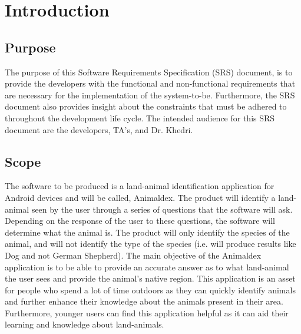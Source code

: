 \documentclass[]{article}
\begin{document}
\tableofcontents
\cleardoublepage
{}

\section{Introduction}
\label{sec:introduction}



\subsection{Purpose}
\label{sub:purpose}

The purpose of this Software Requirements Specification (SRS) document, is to provide the developers with the functional and non-functional requirements that are necessary for the implementation of the system-to-be. Furthermore, the SRS document also provides insight about the constraints that must be adhered to throughout the development life cycle. The intended audience for this SRS document are the developers, TA's, and Dr. Khedri.

\cbstart
\subsection{Scope}
\label{sub:scope}

The software to be produced is a land-animal identification application for Android devices and will be called, Animaldex. The product will identify a land-animal seen by the user through a series of questions that the software will ask. Depending on the response of the user to these questions, the software will determine what the animal is. The product will only identify the species of the animal, and will not identify the type of the species (i.e. will produce results like Dog and not German Shepherd).
The main objective of the Animaldex application is to be able to provide an accurate answer as to what land-animal the user sees and provide the animal's native region. This application is an asset for people who spend a lot of time outdoors as they can quickly identify animals and further enhance their knowledge about the animals present in their area. Furthermore, younger users can find this application helpful as it can aid their learning and knowledge about land-animals.
\cbend
\end{document}
